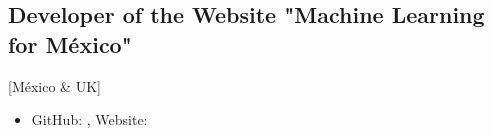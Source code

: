 \documentclass{mycv}
\begin{document}
\subsection{Developer of the Website "Machine Learning for M\'exico"}[M\'exico \& UK]
\begin{itemize}
\item GitHub: \href{https://github.com/ML4MX}{\faGithub*}, Website: \href{https://ml4mx.github.io/website/}{\faExternalLink*} 
\end{itemize}
\end{document}

